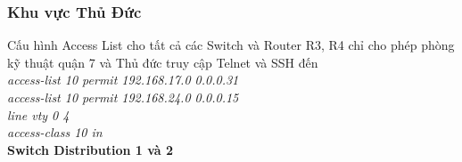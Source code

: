 \documentclass[a4paper, 12pt]{article}
\begin{document}
\subsubsection{Khu vực Thủ Đức}
\hspace*{1cm}Cấu hình Access List cho tất cả các Switch và Router R3, R4 chỉ cho phép phòng kỹ thuật quận 7 và Thủ đức truy cập Telnet và SSH đến\\
\hspace*{2cm}\textit{access-list 10 permit 192.168.17.0 0.0.0.31\\
\hspace*{2cm}access-list 10 permit 192.168.24.0 0.0.0.15\\
\hspace*{2cm}line vty 0 4\\
\hspace*{2cm}access-class 10 in\\}
\hspace*{1cm}\textbf{Switch Distribution 1 và 2}\\
\end{document}

